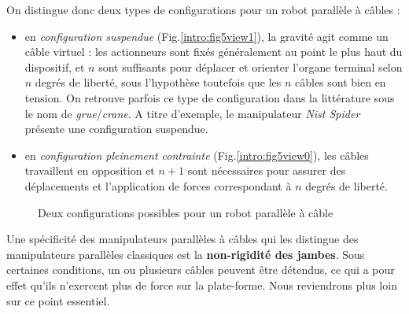 On distingue donc deux types de configurations pour un robot parallèle à câbles 
:
\begin{itemize}
 \item en {\it configuration suspendue} (Fig.\ref{intro:fig5view1}), la gravité 
agit comme un câble virtuel : les actionneurs sont fixés généralement au point 
le plus haut du dispositif, et $n$ sont suffisants pour déplacer et orienter 
l'organe terminal selon $n$ degrés de liberté, sous l'hypoth\`ese toutefois que 
les $n$ c\^ables sont bien en tension. On retrouve parfois ce type de 
configuration dans la littérature sous le nom de {\it grue}/{\it crane}. A 
titre d'exemple, le manipulateur {\it Nist Spider}\cite{1992:Albus.Bostelman.ea} 
présente une configuration suspendue.
 \item en {\it configuration pleinement contrainte} 
(Fig.\ref{intro:fig5view0}), les câbles travaillent en opposition et $n+1$ sont 
nécessaires pour assurer des déplacements et l'application de forces 
correspondant à $n$ degrés de liberté.
\end{itemize}

\begin{figure}[!ht]
  \centering
\hfill
    \caption{\footnotesize Deux configurations possibles pour un robot 
parallèle 
à câble}
\label{intro:fig5}
\end{figure}

Une sp\'ecificit\'e des manipulateurs parallèles à câbles qui les 
distingue des manipulateurs parallèles classiques est la {\bf non-rigidité 
des jam\-bes}. Sous certaines conditions, un ou plusieurs câbles peuvent être 
détendus, ce qui a pour effet qu'ils n'exercent plus de force sur la 
plate-forme. Nous reviendrons plus loin sur ce point essentiel.

